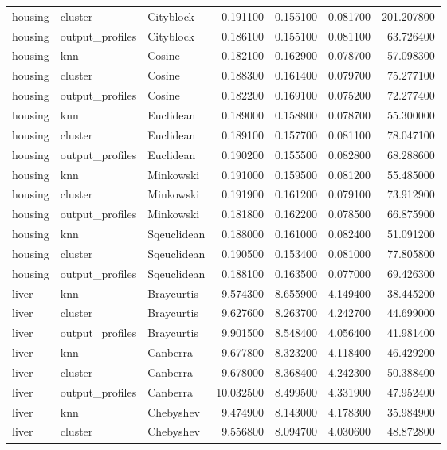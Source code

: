 \begin{tabular}{lllrrrr}
housing & cluster & Cityblock & 0.191100 & 0.155100 & 0.081700 & 201.207800 \\
housing & output\_profiles & Cityblock & 0.186100 & 0.155100 & 0.081100 & 63.726400 \\
housing & knn & Cosine & 0.182100 & 0.162900 & 0.078700 & 57.098300 \\
housing & cluster & Cosine & 0.188300 & 0.161400 & 0.079700 & 75.277100 \\
housing & output\_profiles & Cosine & 0.182200 & 0.169100 & 0.075200 & 72.277400 \\
housing & knn & Euclidean & 0.189000 & 0.158800 & 0.078700 & 55.300000 \\
housing & cluster & Euclidean & 0.189100 & 0.157700 & 0.081100 & 78.047100 \\
housing & output\_profiles & Euclidean & 0.190200 & 0.155500 & 0.082800 & 68.288600 \\
housing & knn & Minkowski & 0.191000 & 0.159500 & 0.081200 & 55.485000 \\
housing & cluster & Minkowski & 0.191900 & 0.161200 & 0.079100 & 73.912900 \\
housing & output\_profiles & Minkowski & 0.181800 & 0.162200 & 0.078500 & 66.875900 \\
housing & knn & Sqeuclidean & 0.188000 & 0.161000 & 0.082400 & 51.091200 \\
housing & cluster & Sqeuclidean & 0.190500 & 0.153400 & 0.081000 & 77.805800 \\
housing & output\_profiles & Sqeuclidean & 0.188100 & 0.163500 & 0.077000 & 69.426300 \\
liver & knn & Braycurtis & 9.574300 & 8.655900 & 4.149400 & 38.445200 \\
liver & cluster & Braycurtis & 9.627600 & 8.263700 & 4.242700 & 44.699000 \\
liver & output\_profiles & Braycurtis & 9.901500 & 8.548400 & 4.056400 & 41.981400 \\
liver & knn & Canberra & 9.677800 & 8.323200 & 4.118400 & 46.429200 \\
liver & cluster & Canberra & 9.678000 & 8.368400 & 4.242300 & 50.388400 \\
liver & output\_profiles & Canberra & 10.032500 & 8.499500 & 4.331900 & 47.952400 \\
liver & knn & Chebyshev & 9.474900 & 8.143000 & 4.178300 & 35.984900 \\
liver & cluster & Chebyshev & 9.556800 & 8.094700 & 4.030600 & 48.872800 \\

\end{tabular}
